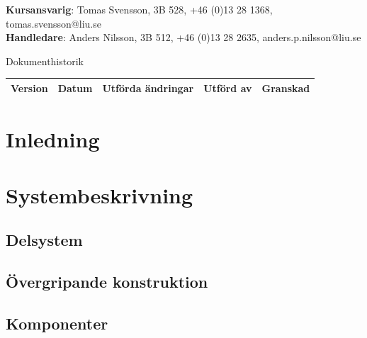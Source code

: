 \documentclass{article}
\begin{document}
\begin{center}
\textbf{Kursansvarig}: Tomas Svensson, 3B 528, +46 (0)13 28 1368, tomas.svensson@liu.se \\
\textbf{Handledare}: Anders Nilsson, 3B 512, +46 (0)13 28 2635, anders.p.nilsson@liu.se
\end{center}
\vspace*{\fill}
\clearpage

\renewcommand*\contentsname{Innehållsförteckning}
\tableofcontents
\clearpage


{
\sffamily
\centering
\large


{\huge 
Dokumenthistorik \\
}
\begin{center}
\begin{tabular}{ | c | c | c | c | c |} 
\hline
\textbf{Version} & \textbf{Datum} & \textbf{Utförda ändringar} & \textbf{Utförd av } & \textbf{Granskad} \\  
\hline
\end{tabular}
\end{center}
}

\clearpage


\section{Inledning}

\clearpage

\section{Systembeskrivning}

\subsection{Delsystem}

\subsection{Övergripande konstruktion}

\subsection{Komponenter}
\end{document}
